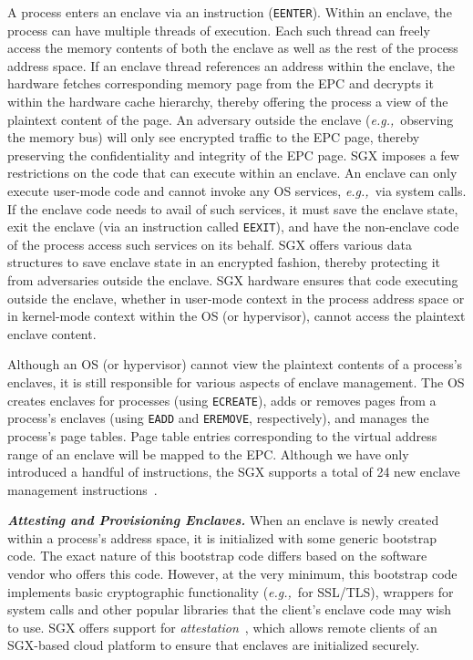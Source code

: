 \documentclass[conference,compsoc]{IEEEtran}
\newcommand{\myparagraph}[1]{\parskip -4pt \indent\par\noindent\textbf{\textit{#1}} \parskip 0pt}
\newcommand{\code}[1]{{\tt \footnotesize #1}}
\newcommand{\eg}{\textit{e.g.,}\xspace}
\begin{document}
A process enters an enclave via an instruction (\code{EENTER}). Within an
enclave, the process can have multiple threads of execution. Each such thread
can freely access the memory contents of both the enclave as well as the rest
of the process address space. If an enclave thread references an address within
the enclave, the hardware fetches corresponding memory page from the EPC and
decrypts it within the hardware cache hierarchy, thereby offering the process a
view of the plaintext content of the page.  An adversary outside the enclave
(\eg~observing the memory bus) will only see encrypted traffic to the EPC page,
thereby preserving the confidentiality and integrity of the EPC page.  SGX
imposes a few restrictions on the code that can execute within an enclave. An
enclave can only execute user-mode code and cannot invoke any OS services,
\eg~via system calls. If the enclave code needs to avail of such services, it
must save the enclave state, exit the enclave (via an instruction called
\code{EEXIT}), and have the non-enclave code of the process access such
services on its behalf. SGX offers various data structures to save enclave
state in an encrypted fashion, thereby protecting it from adversaries outside
the enclave. SGX hardware ensures that code executing outside the enclave,
whether in user-mode context in the process address space or in kernel-mode
context within the OS (or hypervisor), cannot access the plaintext enclave 
content.

Although an OS (or hypervisor) cannot view the plaintext contents of a
process's enclaves, it is still responsible for various aspects of enclave
management. The OS creates enclaves for processes (using \code{ECREATE}), adds
or removes pages from a process's enclaves (using \code{EADD} and
\code{EREMOVE}, respectively), and manages the process's page tables. Page
table entries corresponding to the virtual address range of an enclave will be
mapped to the EPC. Although we have only introduced a handful of instructions,
the SGX supports a total of 24 new enclave management
instructions~\cite{intelsgx:sep13,intelsgx:oct14}.

\myparagraph{Attesting and Provisioning Enclaves.}
%
When an enclave is newly created within a process's address space, it is
initialized with some generic bootstrap code. The exact nature of this
bootstrap code differs based on the software vendor who offers this code.
However, at the very minimum, this bootstrap code implements basic cryptographic
functionality (\eg~for SSL/TLS), wrappers for system calls and other popular
libraries that the client's enclave code may wish to use.  SGX offers support
for \textit{attestation}~\cite{sgx:attest:hasp13}, which allows remote clients
of an SGX-based cloud platform to ensure that enclaves are initialized
securely. 
\end{document}
